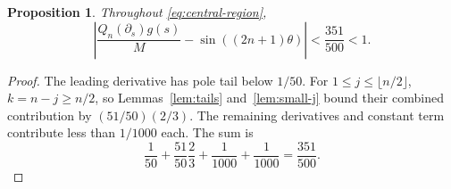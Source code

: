 \documentclass[11pt,letterpaper]{article}
\numberwithin{equation}{section}
\newtheorem{proposition}[theorem]{Proposition}
\begin{document}
\begin{proposition}\label{prop:central-error}
Throughout \eqref{eq:central-region},
\begin{equation}\label{eq:central-error}
 \left|\frac{Q_n(\partial_s)g(s)}M-\sin((2n+1)\theta)\right|
 <\frac{351}{500}<1.
\end{equation}
\end{proposition}
\begin{proof}
The leading derivative has pole tail below $1/50$. For $1\le j\le\lfloor n/2\rfloor$, $k=n-j\ge n/2$, so Lemmas~\ref{lem:tails} and~\ref{lem:small-j} bound their combined contribution by $(51/50)(2/3)$. The remaining derivatives and constant term contribute less than $1/1000$ each. The sum is
\[
 \frac1{50}+\frac{51}{50}\frac23+\frac1{1000}+\frac1{1000}=\frac{351}{500}.
\]
\end{proof}
\end{document}
